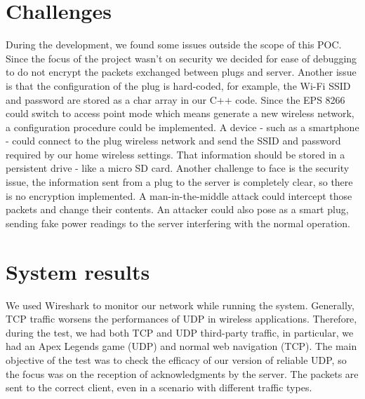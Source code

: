 \documentclass[conference]{IEEEtran}
\begin{document}
	\section{Challenges}
	During the development, we found some issues outside the scope of this POC. Since the focus of the project wasn't on security we decided for ease of debugging to do not encrypt the packets exchanged between plugs and server. Another issue is that the configuration of the plug is hard-coded, for example, the Wi-Fi SSID and password are stored as a char array in our C++ code. Since the EPS 8266 could switch to access point mode which means generate a new wireless network, a configuration procedure could be implemented. A device - such as a smartphone - could connect to the plug wireless network and send the SSID and password required by our home wireless settings. That information should be stored in a persistent drive - like a micro SD card.
	Another challenge to face is the security issue, the information sent from a plug to the server is completely clear, so there is no encryption implemented. A man-in-the-middle attack could intercept those packets and change their contents. An attacker could also pose as a smart plug, sending fake power readings to the server interfering with the normal operation.
	
	\section{System results}
	We used Wireshark to monitor our network while running the system. Generally, TCP traffic worsens the performances of UDP in wireless applications. Therefore, during the test, we had both TCP and UDP third-party traffic, in particular, we had an Apex Legends game (UDP) and normal web navigation (TCP). The main objective of the test was to check the efficacy of our version of reliable UDP, so the focus was on the reception of acknowledgments by the server. The packets are sent to the correct client, even in a scenario with different traffic types.
	
\end{document}
